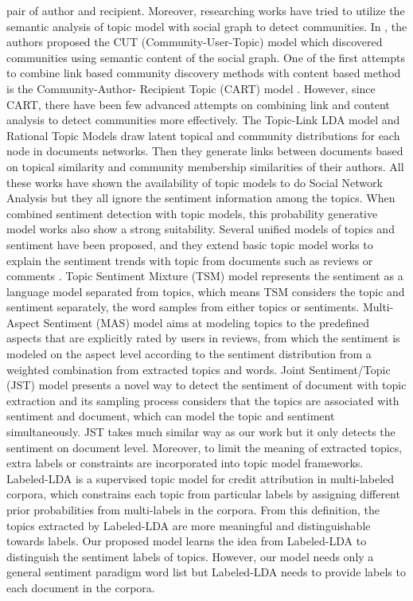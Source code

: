 \documentclass[twocolumn]{svjour3}          %
\begin{document}
pair of author and recipient. Moreover, researching works have tried to utilize the semantic analysis of topic model with social graph to detect communities. In \cite{zhou2006probabilistic}, the authors proposed the CUT (Community-User-Topic) model which discovered communities using semantic content of the social graph. One of the first attempts to combine link based community discovery methods with content based method is the Community-Author- Recipient Topic (CART) model \cite{pathak2008social}. However, since CART, there have been few advanced attempts on combining link and content analysis to detect communities more effectively. The Topic-Link LDA model \cite{liu2009topic} and Rational Topic Models \cite{chang2009relational} draw latent topical and community distributions for each node in documents networks. Then they generate links between documents based on topical similarity and community membership similarities of their authors. All these works have shown the availability of topic models to do Social Network Analysis but they all ignore the sentiment information among the topics. When combined sentiment detection with topic models, this probability generative model works also show a strong suitability. Several unified models of topics and sentiment have been proposed, and they extend basic topic model works to explain the sentiment trends with topic from documents such as reviews or comments \cite{mei2007topic,lin2009joint,jo2011aspect}. Topic Sentiment Mixture (TSM) model \cite{mei2007topic} represents the sentiment as a language model separated from topics, which means TSM considers the topic and sentiment separately, the word samples from either topics or sentiments. Multi-Aspect Sentiment (MAS) model \cite{jo2011aspect} aims at modeling topics to the predefined aspects that are explicitly rated by users in reviews, from which the sentiment is modeled on the aspect level according to the sentiment distribution from a weighted combination from extracted topics and words. Joint Sentiment/Topic (JST) model \cite{lin2009joint} presents a novel way to detect the sentiment of document with topic extraction and its sampling process considers that the topics are associated with sentiment and document, which can model the topic and sentiment simultaneously. JST takes much similar way as our work but it only detects the sentiment on document level. Moreover, to limit the meaning of extracted topics, extra labels or constraints are incorporated into topic model frameworks. Labeled-LDA \cite{ramage2009labeled} is a supervised topic model for credit attribution in multi-labeled corpora, which constrains each topic from particular labels by assigning different prior probabilities from multi-labels in the corpora. From this definition, the topics extracted by Labeled-LDA are more meaningful and distinguishable towards labels. Our proposed model learns the idea from Labeled-LDA to distinguish the sentiment labels of topics. However, our model needs only a general sentiment paradigm word list but Labeled-LDA needs to provide labels to each document in the corpora.
\end{document}
